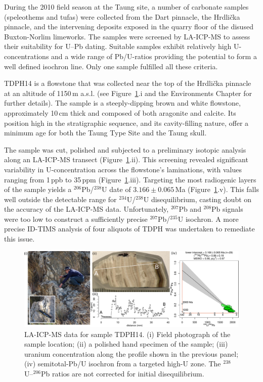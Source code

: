 \documentclass[11pt]{article}
\begin{document}
During the 2010 field season at the Taung site, a number of carbonate
samples (speleothems and tufas) were collected from the Dart pinnacle,
the Hrdli\v{c}ka pinnacle, and the intervening deposits exposed in the
quarry floor of the disused Buxton-Norlim limeworks.  The samples were
screened by LA-ICP-MS to assess their suitability for U--Pb
dating. Suitable samples exhibit relatively high U-concentrations and
a wide range of Pb/U-ratios providing the potential to form a well
defined isochron line. Only one sample fulfilled all these criteria.

TDPH14 is a flowstone that was collected near the top of the
Hrdli\v{c}ka pinnacle at an altitude of 1150\,m a.s.l. (see
Figure~\ref{fig:TDPH14ICPMS}.i and the Environments Chapter for
further details). The sample is a steeply-dipping brown and white
flowstone, approximately 10\,cm thick and composed of both aragonite
and calcite. Its position high in the stratigraphic sequence, and its
cavity-filling nature, offer a minimum age for both the Taung Type
Site and the Taung skull.

The sample was cut, polished and subjected to a preliminary isotopic
analysis along an LA-ICP-MS transect
(Figure~\ref{fig:TDPH14ICPMS}.ii).  This screening revealed
significant variability in U-concentration across the flowstone's
laminations, with values ranging from 1\,ppb to 35\,ppm
(Figure~\ref{fig:TDPH14ICPMS}.iii). Targeting the most radiogenic
layers of the sample yields a ${}^{206}$Pb/${}^{238}$U date of
$3.166\pm{0.065}$\,Ma (Figure~\ref{fig:TDPH14ICPMS}.v). This falls
well outside the detectable range for ${}^{234}$U/${}^{238}$U
disequilibrium, casting doubt on the accuracy of the LA-ICP-MS
data. Unfortunately, ${}^{207}$Pb and ${}^{208}$Pb signals were too
low to construct a sufficiently precise ${}^{207}$Pb/${}^{235}$U
isochron. A more precise ID-TIMS analysis of four aliquots of TDPH was
undertaken to remediate this issue.\medskip

\begin{figure}[!ht]
  \centering
  \includegraphics[width=\linewidth]{TDPH14ICPMS2.pdf}
  \caption{LA-ICP-MS data for sample TDPH14. (i) Field photograph of
    the sample location; (ii) a polished hand specimen of the sample;
    (iii) uranium concentration along the profile shown in the
    previous panel; (iv) semitotal-Pb/U isochron from a targeted
    high-U zone. The ${}^{238}$U--${}^{206}$Pb ratios are not
    corrected for initial disequilibrium.}
  \label{fig:TDPH14ICPMS}
\end{figure}
\end{document}
